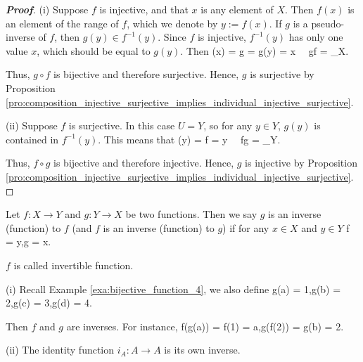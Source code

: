 \begin{proof}[\bf Proof]
\ben
\item [(i)] Suppose $f$ is injective, and that $x$ is any element of $X$. Then $f(x)$ is an element of the range of $f$, which we denote by $y := f(x)$. If $g$ is a pseudo-inverse of $f$, then $g(y) \in f^{-1}(y)$. Since $f$ is injective, $f^{-1}(y)$ has only one value $x$, which should be equal to $g(y)$. Then
\be
{}(x) = g = g(y) = x \ \ra\ g\circ f = \identity_X.
\ee

Thus, $g\circ f$ is bijective and therefore surjective. Hence, $g$ is surjective by Proposition \ref{pro:composition_injective_surjective_implies_individual_injective_surjective}.

\item [(ii)] Suppose $f$ is surjective. In this case $U = Y$, so for any $y\in Y$, $g(y)$ is contained in $f^{-1}(y)$. This means that
\be
{}(y) = f = y \ \ra\ f\circ g = \identity_Y.
\ee

Thus, $f\circ g$ is bijective and therefore injective. Hence, $g$ is injective by Proposition \ref{pro:composition_injective_surjective_implies_individual_injective_surjective}.
\een
\end{proof}


\begin{definition}\label{def:inverse_function}
Let $f:X\to Y$ and $g:Y\to X$ be two functions. Then we say $g$ is an inverse (function) to $f$ (and $f$ is an inverse (function) to $g$) if for any $x\in X$ and $y\in Y$
\be
f = y,\qquad g = x.\qquad\qquad {}
\ee

$f$ is called invertible function.
\end{definition}

\begin{example}\label{exa:inverse_function_4}
\ben
\item [(i)]
Recall Example \ref{exa:bijective_function_4}, we also define
\be
g(a) = 1,\quad g(b) = 2,\quad g(c) = 3,\quad g(d) = 4.
\ee

Then $f$ and $g$ are inverses. For instance,
\be
f(g(a)) = f(1) = a,\qquad g(f(2)) = g(b) = 2.
\ee

\item [(ii)] The identity function $i_A:A\to A$ is its own inverse.
\een
\end{example}


